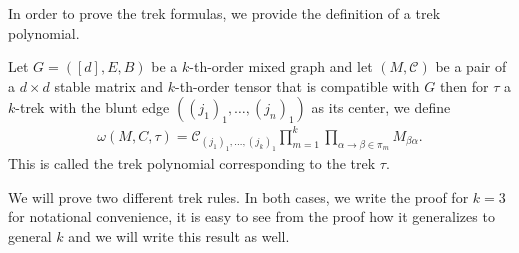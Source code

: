 \documentclass{biometrika}
\begin{document}
In order to prove the trek formulas, we provide the definition of a trek polynomial. 

\begin{definition}
Let $G = ([d],E,B)$ be a $k$-th-order mixed graph and let $(M,\mathcal{C})$ be a pair of a $d\times d$ stable matrix and $k$-th-order tensor that is compatible with $G$ then for $\tau$ a $k$-trek with the blunt edge 
$((j_1)_1, \dots, (j_n)_1)$ as its center, we define 
\begin{align*}
    \omega(M,C,\tau) = \mathcal{C}_{(j_1)_1, \dots, (j_k)_1} \prod_{m = 1}^k \prod_{\alpha \rightarrow \beta \in \pi_m} M_{\beta \alpha}.  
\end{align*}
This is called the trek polynomial corresponding to the trek $\tau$. 
\end{definition}    

We will prove two different trek rules. In both cases, we write the proof for $k = 3$ for notational convenience, it is easy to see from the 
proof how it generalizes to general $k$ and we will write this result as well. 
\end{document}
